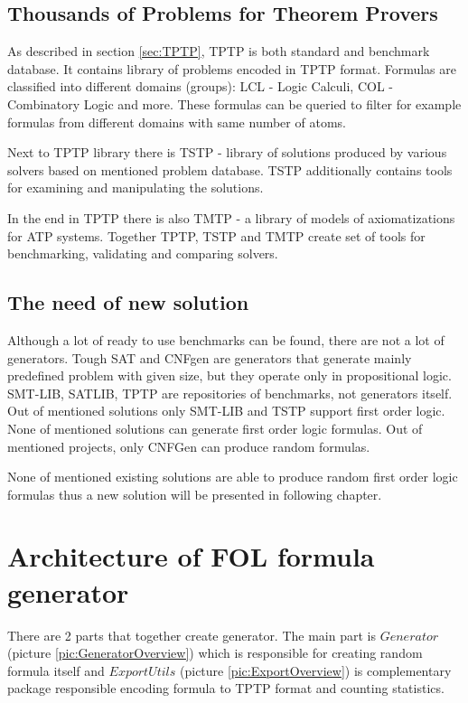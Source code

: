 \section{Thousands of Problems for Theorem Provers}

As described in section \ref{sec:TPTP}, TPTP is both standard and benchmark database. It contains library of problems encoded in TPTP format. Formulas are classified into different domains (groups): LCL - Logic Calculi, COL - Combinatory Logic and more. These formulas can be queried to filter for example formulas from different domains with same number of atoms. 

Next to TPTP library there is \gls{TSTP} - library of solutions produced by various solvers based on mentioned problem database. \gls{TSTP} additionally contains tools for examining and manipulating the solutions. 

In the end in TPTP there is also \gls{TMTP} - a library of models of axiomatizations for \gls{ATP} systems. Together TPTP, TSTP and TMTP create set of tools for benchmarking, validating and comparing solvers.

\section{The need of new solution}

Although a lot of ready to use benchmarks can be found, there are not a lot of generators. Tough SAT and CNFgen are generators that generate mainly predefined problem with given size, but they operate only in propositional logic. SMT-LIB, SATLIB, TPTP are repositories of benchmarks, not generators itself. Out of mentioned solutions only SMT-LIB and TSTP support first order logic. None of mentioned solutions can generate first order logic formulas. Out of mentioned projects, only CNFGen can produce random formulas.

None of mentioned existing solutions are able to produce random first order logic formulas thus a new solution will be presented in following chapter.



\chapter{Architecture of FOL formula generator}
\label{chap:GeneratorArchitecture}

There are 2 parts that together create generator. The main part is $Generator$ (picture \ref{pic:GeneratorOverview}) which is responsible for creating random formula itself and $ExportUtils$ (picture \ref{pic:ExportOverview}) is complementary package responsible encoding formula to \gls{TPTP} format and counting statistics.

